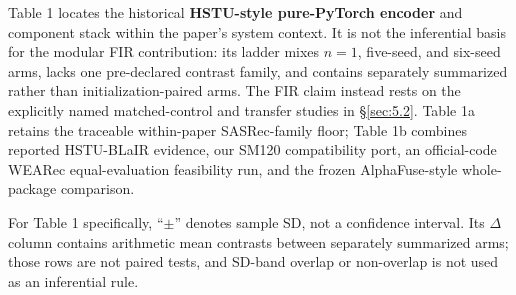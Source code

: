 \ifextendedmaterial

Table 1 locates the historical \textbf{HSTU-style pure-PyTorch encoder} and component
stack within the paper's system context. It is not the inferential basis for the modular
FIR contribution: its ladder mixes $n=1$, five-seed, and six-seed arms, lacks one
pre-declared contrast family, and contains separately summarized rather than
initialization-paired arms. The FIR claim instead rests on the explicitly named
matched-control and transfer studies in \S\ref{sec:5.2}. Table 1a retains the traceable
within-paper SASRec-family floor; Table 1b combines reported HSTU-BLaIR evidence, our
SM120 compatibility port, an official-code WEARec equal-evaluation feasibility run, and
the frozen AlphaFuse-style whole-package comparison.



For Table 1 specifically, ``\ensuremath{\pm}'' denotes sample SD, not a
confidence interval. Its \ensuremath{\Delta} column contains arithmetic mean
contrasts between separately summarized arms; those rows are not paired tests,
and SD-band overlap or non-overlap is not used as an inferential rule.

